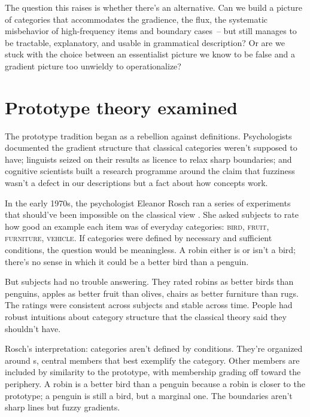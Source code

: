 The question this raises is whether there's an alternative. Can we build a picture of categories that accommodates the gradience, the flux, the systematic misbehavior of high-frequency items and boundary cases~-- but still manages to be tractable, explanatory, and usable in grammatical description? Or are we stuck with the choice between an essentialist picture we know to be false and a gradient picture too unwieldy to operationalize?

\section{Prototype theory examined}
\label{sec:1:prototype}

The prototype tradition began as a rebellion against definitions. Psychologists documented the gradient structure that classical categories weren't supposed to have; linguists seized on their results as licence to relax sharp boundaries; and cognitive scientists built a research programme around the claim that fuzziness wasn't a defect in our descriptions but a fact about how concepts work.

In the early 1970s, the psychologist Eleanor Rosch ran a series of experiments that should've been impossible on the classical view \citep{rosch1975}. She asked subjects to rate how good an example each item was of everyday categories: \textsc{bird}, \textsc{fruit}, \textsc{furniture}, \textsc{vehicle}. If categories were defined by necessary and sufficient conditions, the question would be meaningless. A robin either is or isn't a bird; there's no sense in which it could be a better bird than a penguin.

But subjects had no trouble answering. They rated robins as better birds than penguins, apples as better fruit than olives, chairs as better furniture than rugs. The ratings were consistent across subjects and stable across time. People had robust intuitions about category structure that the classical theory said they shouldn't have.

Rosch's interpretation: categories aren't defined by conditions. They're organized around s, central members that best exemplify the category. Other members are included by similarity to the prototype, with membership grading off toward the periphery. A robin is a better bird than a penguin because a robin is closer to the prototype; a penguin is still a bird, but a marginal one. The boundaries aren't sharp lines but fuzzy gradients.

